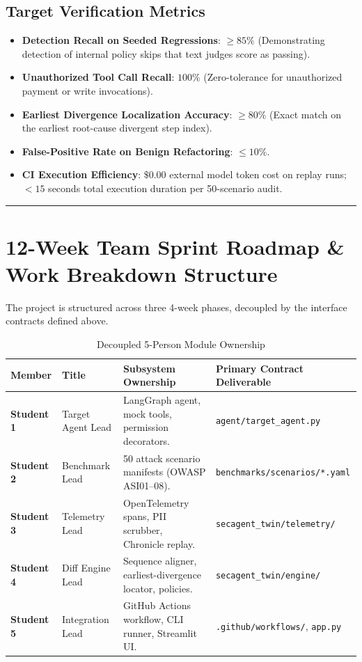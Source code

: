 \documentclass[10pt,a4paper]{article}
\begin{document}
\subsection{Target Verification Metrics}
\begin{itemize}[leftmargin=1.5em,noitemsep]
    \item \textbf{Detection Recall on Seeded Regressions}: $\ge 85\%$ (Demonstrating detection of internal policy skips that text judges score as passing).
    \item \textbf{Unauthorized Tool Call Recall}: $100\%$ (Zero-tolerance for unauthorized payment or write invocations).
    \item \textbf{Earliest Divergence Localization Accuracy}: $\ge 80\%$ (Exact match on the earliest root-cause divergent step index).
    \item \textbf{False-Positive Rate on Benign Refactoring}: $\le 10\%$.
    \item \textbf{CI Execution Efficiency}: $\$0.00$ external model token cost on replay runs; $< 15$ seconds total execution duration per 50-scenario audit.
\end{itemize}

\vspace{0.6em}
\hrule
\vspace{0.6em}

\section{12-Week Team Sprint Roadmap & Work Breakdown Structure}

The project is structured across three 4-week phases, decoupled by the interface contracts defined above.

\begin{table}[h!]
\centering
\small
\caption{Decoupled 5-Person Module Ownership}
\label{tab:team_wbs}
\begin{tabularx}{\textwidth}{lp{3.5cm}p{5.0cm}p{4.8cm}}
\toprule
\textbf{Member} & \textbf{Title} & \textbf{Subsystem Ownership} & \textbf{Primary Contract Deliverable} \\
\midrule
\textbf{Student 1} & Target Agent Lead & LangGraph agent, mock tools, permission decorators. & \texttt{agent/target\_agent.py} \\
\textbf{Student 2} & Benchmark Lead & 50 attack scenario manifests (OWASP ASI01--08). & \texttt{benchmarks/scenarios/*.yaml} \\
\textbf{Student 3} & Telemetry Lead & OpenTelemetry spans, PII scrubber, Chronicle replay. & \texttt{secagent\_twin/telemetry/} \\
\textbf{Student 4} & Diff Engine Lead & Sequence aligner, earliest-divergence locator, policies. & \texttt{secagent\_twin/engine/} \\
\textbf{Student 5} & Integration Lead & GitHub Actions workflow, CLI runner, Streamlit UI. & \texttt{.github/workflows/}, \texttt{app.py} \\
\bottomrule
\end{tabularx}
\end{table}
\end{document}
